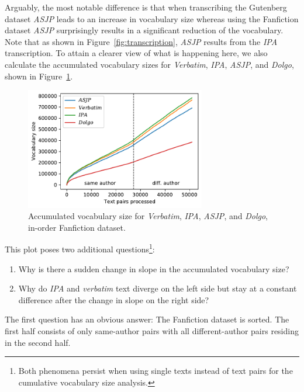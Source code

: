 Arguably, the most notable difference is that when transcribing the Gutenberg dataset \textit{ASJP} leads to an increase in vocabulary size whereas using the Fanfiction dataset \textit{ASJP} surprisingly results in a significant reduction of the vocabulary.
Note that as shown in Figure~\ref{fig:transcription}, \textit{ASJP} results from the \textit{IPA} transcription.
To attain a clearer view of what is happening here, we also calculate the accumulated vocabulary sizes for \textit{Verbatim}, \textit{IPA}, \textit{ASJP}, and \textit{Dolgo}, shown in Figure~\ref{fig:cumvocab_all}.
\begin{figure}
  \centering
  \includegraphics[width=0.7\textwidth]{figures/cum_vocab_size_ff_inorder_all}
  \caption{Accumulated vocabulary size for \textit{Verbatim}, \textit{IPA}, \textit{ASJP}, and \textit{Dolgo}, in-order Fanfiction dataset.}
  \label{fig:cumvocab_all}
\end{figure}
This plot poses two additional questions\footnote{Both phenomena persist when using single texts instead of text pairs for the cumulative vocabulary size analysis.}:
\begin{enumerate}
    \item Why is there a sudden change in slope in the accumulated vocabulary size?
    \item Why do \textit{IPA} and \textit{verbatim} text diverge on the left side but stay at a constant difference after the change in slope on the right side?
\end{enumerate}
The first question has an obvious answer:
The Fanfiction dataset is sorted.
The first half consists of only same-author pairs with all different-author pairs residing in the second half.
